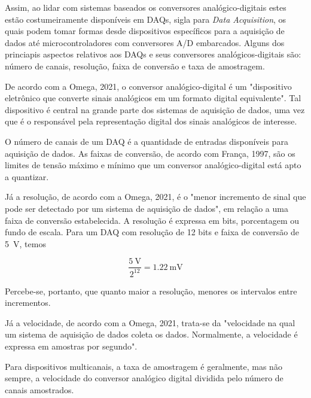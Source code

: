 \documentclass[
	12pt,				
	oneside,			
	a4paper,			
	english,			
	brazil,			
	]{abntex2ppgsi}
\begin{document}
Assim, ao lidar com sistemas baseados os conversores analógico-digitais estes estão costumeiramente disponíveis em DAQs, sigla para \textit{Data Acquisition}, os quais podem tomar formas desde dispositivos específicos para a aquisição de dados até microcontroladores com conversores A/D embarcados. Alguns dos princiapis aspectos relativos aos DAQs e seus conversores analógicos-digitais são: número de canais, resolução, faixa de conversão e taxa de amostragem.

De acordo com a Omega, 2021, o conversor analógico-digital é um "dispositivo eletrônico que converte sinais analógicos em um formato digital equivalente". Tal dispositivo é central na grande parte dos sistemas de aquisição de dados, uma vez que é o responsável pela representação digital dos sinais analógicos de interesse. 


O número de canais de um DAQ é a quantidade de entradas disponíveis para aquisição de dados. As faixas de conversão, de acordo com França, 1997, são os limites de tensão máximo e mínimo que um conversor analógico-digital está apto a quantizar.

Já a resolução, de acordo com a Omega, 2021, é o "menor incremento de sinal que pode ser detectado por um sistema de aquisição de dados", em relação a uma faixa de conversão estabelecida. A resolução é expressa em bits, porcentagem ou fundo de escala. Para um DAQ com resolução de 12 bits e faixa de conversão de \SI{5}{\volt}, temos 

\begin{equation}
	\frac{\SI{5}{\volt}}{2^{12}} = \SI{1,22}{\milli\volt}
	\label{eq: Resolução de DAQ de 12 bits com faixa de conversão de 5 volts}
\end{equation}


Percebe-se, portanto, que quanto maior a resolução, menores os intervalos entre incrementos. 

Já a velocidade, de acordo com a Omega, 2021, trata-se da "velocidade na qual um sistema de aquisição de dados coleta os dados. Normalmente, a velocidade é expressa em amostras por segundo". 

Para dispositivos multicanais, a taxa de amostragem é geralmente, mas não sempre, a velocidade do conversor analógico digital dividida pelo número de canais amostrados. 
\end{document}
